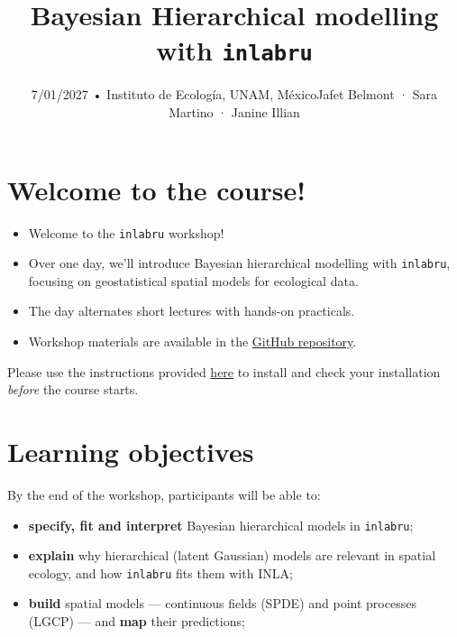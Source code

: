 \documentclass[
  letterpaper,
  DIV=11,
  numbers=noendperiod]{scrartcl}
\title{Bayesian Hierarchical modelling with \texttt{inlabru}}
\subtitle{7/01/2027 • Instituto de Ecología, UNAM, MéxicoJafet Belmont ·
Sara Martino · Janine Illian}
\author{}
\date{}
\makeatletter
\providecommand{\tightlist}{%
  \setlength{\itemsep}{0pt}\setlength{\parskip}{0pt}}
\renewcommand{\maketitle}{\bgroup\setlength{\parindent}{0pt}
\begin{flushleft}
  {\sffamily\huge\textbf{\MakeUppercase{\@title}}} \vspace{0.3cm} \newline
  {\Large {\@subtitle}} \newline
  \@author
\end{flushleft}\egroup
}
\makeatother
\begin{document}
\maketitle

\pagestyle{mystyle}


\section{Welcome to the course!}\label{welcome-to-the-course}

\begin{itemize}
\tightlist
\item
  Welcome to the \texttt{inlabru} workshop!
\item
  Over one day, we'll introduce Bayesian hierarchical modelling with
  \texttt{inlabru}, focusing on geostatistical spatial models for
  ecological data.
\item
  The day alternates short lectures with hands-on practicals.
\item
  Workshop materials are available in the
  \href{https://github.com/inlabru-courses/Mexico_2026}{GitHub
  repository}.
\end{itemize}

\begin{tcolorbox}[enhanced jigsaw, arc=.35mm, bottomrule=.15mm, bottomtitle=1mm, breakable, colback=white, colbacktitle=quarto-callout-warning-color!10!white, colframe=quarto-callout-warning-color-frame, coltitle=black, left=2mm, leftrule=.75mm, opacityback=0, opacitybacktitle=0.6, rightrule=.15mm, title=\textcolor{quarto-callout-warning-color}{\faExclamationTriangle}\hspace{0.5em}{Important! ⚠️}, titlerule=0mm, toprule=.15mm, toptitle=1mm]

Please use the instructions provided \href{Install_software.qmd}{here}
to install and check your installation \emph{before} the course starts.

\end{tcolorbox}

\section{Learning objectives}\label{learning-objectives}

By the end of the workshop, participants will be able to:

\begin{itemize}
\tightlist
\item
  \textbf{specify, fit and interpret} Bayesian hierarchical models in
  \texttt{inlabru};
\item
  \textbf{explain} why hierarchical (latent Gaussian) models are
  relevant in spatial ecology, and how \texttt{inlabru} fits them with
  INLA;
\item
  \textbf{build} spatial models --- continuous fields (SPDE) and point
  processes (LGCP) --- and \textbf{map} their predictions;
\end{itemize}
\end{document}

